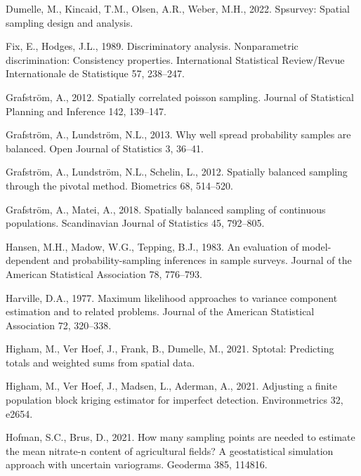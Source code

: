 \documentclass[]{elsarticle} %
\begin{document}
\leavevmode\hypertarget{ref-dumelle2022spsurvey}{}%
Dumelle, M., Kincaid, T.M., Olsen, A.R., Weber, M.H., 2022. Spsurvey:
Spatial sampling design and analysis.

\leavevmode\hypertarget{ref-fix1989discriminatory}{}%
Fix, E., Hodges, J.L., 1989. Discriminatory analysis. Nonparametric
discrimination: Consistency properties. International Statistical
Review/Revue Internationale de Statistique 57, 238--247.

\leavevmode\hypertarget{ref-grafstrom2012spatiallypoisson}{}%
Grafström, A., 2012. Spatially correlated poisson sampling. Journal of
Statistical Planning and Inference 142, 139--147.

\leavevmode\hypertarget{ref-grafstrom2013well}{}%
Grafström, A., Lundström, N.L., 2013. Why well spread probability
samples are balanced. Open Journal of Statistics 3, 36--41.

\leavevmode\hypertarget{ref-grafstrom2012spatially}{}%
Grafström, A., Lundström, N.L., Schelin, L., 2012. Spatially balanced
sampling through the pivotal method. Biometrics 68, 514--520.

\leavevmode\hypertarget{ref-grafstrom2018spatially}{}%
Grafström, A., Matei, A., 2018. Spatially balanced sampling of
continuous populations. Scandinavian Journal of Statistics 45, 792--805.

\leavevmode\hypertarget{ref-hansen1983evaluation}{}%
Hansen, M.H., Madow, W.G., Tepping, B.J., 1983. An evaluation of
model-dependent and probability-sampling inferences in sample surveys.
Journal of the American Statistical Association 78, 776--793.

\leavevmode\hypertarget{ref-harville1977maximum}{}%
Harville, D.A., 1977. Maximum likelihood approaches to variance
component estimation and to related problems. Journal of the American
Statistical Association 72, 320--338.

\leavevmode\hypertarget{ref-higham2021sptotal}{}%
Higham, M., Ver Hoef, J., Frank, B., Dumelle, M., 2021. Sptotal:
Predicting totals and weighted sums from spatial data.

\leavevmode\hypertarget{ref-higham2021adjusting}{}%
Higham, M., Ver Hoef, J., Madsen, L., Aderman, A., 2021. Adjusting a
finite population block kriging estimator for imperfect detection.
Environmetrics 32, e2654.

\leavevmode\hypertarget{ref-hofman2021many}{}%
Hofman, S.C., Brus, D., 2021. How many sampling points are needed to
estimate the mean nitrate-n content of agricultural fields? A
geostatistical simulation approach with uncertain variograms. Geoderma
385, 114816.
\end{document}
